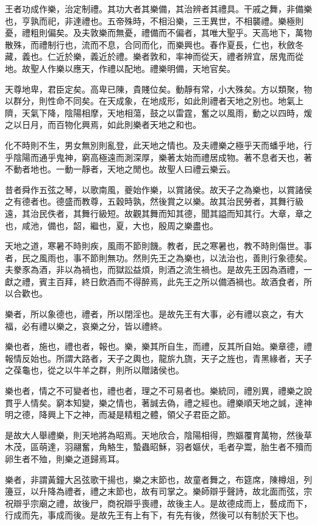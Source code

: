 王者功成作樂，治定制禮。其功大者其樂備，其治辨者其禮具。干戚之舞，非備樂也，亨孰而祀，非達禮也。五帝殊時，不相沿樂，三王異世，不相襲禮。樂極則憂，禮粗則偏矣。及夫敦樂而無憂，禮備而不偏者，其唯大聖乎。天高地下，萬物散殊，而禮制行也，流而不息，合同而化，而樂興也。春作夏長，仁也，秋斂冬藏，義也。仁近於樂，義近於禮。樂者敦和，率神而從天，禮者辨宜，居鬼而從地。故聖人作樂以應天，作禮以配地。禮樂明備，天地官矣。

天尊地卑，君臣定矣。高卑已陳，貴賤位矣。動靜有常，小大殊矣。方以類聚，物以群分，則性命不同矣。在天成象，在地成形，如此則禮者天地之別也。地氣上隮，天氣下降，陰陽相摩，天地相蕩，鼓之以雷霆，奮之以風雨，動之以四時，煖之以日月，而百物化興焉，如此則樂者天地之和也。

化不時則不生，男女無別則亂登，此天地之情也。及夫禮樂之極乎天而蟠乎地，行乎陰陽而通乎鬼神，窮高極遠而測深厚，樂著太始而禮居成物。著不息者天也，著不動者地也。一動一靜者，天地之閒也。故聖人曰禮云樂云。

昔者舜作五弦之琴，以歌南風，夔始作樂，以賞諸侯。故天子之為樂也，以賞諸侯之有德者也。德盛而教尊，五穀時孰，然後賞之以樂。故其治民勞者，其舞行級遠，其治民佚者，其舞行級短。故觀其舞而知其德，聞其謚而知其行。大章，章之也，咸池，備也，韶，繼也，夏，大也，殷周之樂盡也。

天地之道，寒暑不時則疾，風雨不節則饑。教者，民之寒暑也，教不時則傷世。事者，民之風雨也，事不節則無功。然則先王之為樂也，以法治也，善則行象德矣。夫豢豕為酒，非以為禍也，而獄訟益煩，則酒之流生禍也。是故先王因為酒禮，一獻之禮，賓主百拜，終日飲酒而不得醉焉，此先王之所以備酒禍也。故酒食者，所以合歡也。

樂者，所以象德也，禮者，所以閉淫也。是故先王有大事，必有禮以哀之，有大福，必有禮以樂之，哀樂之分，皆以禮終。

樂也者，施也，禮也者，報也。樂，樂其所自生，而禮，反其所自始。樂章德，禮報情反始也。所謂大路者，天子之輿也，龍旂九旒，天子之旌也，青黑緣者，天子之葆龜也，從之以牛羊之群，則所以贈諸侯也。

樂也者，情之不可變者也，禮也者，理之不可易者也。樂統同，禮別異，禮樂之說貫乎人情矣。窮本知變，樂之情也，著誠去偽，禮之經也。禮樂順天地之誠，達神明之德，降興上下之神，而凝是精粗之體，領父子君臣之節。

是故大人舉禮樂，則天地將為昭焉。天地欣合，陰陽相得，煦嫗覆育萬物，然後草木茂，區萌達，羽翮奮，角觡生，蟄蟲昭穌，羽者嫗伏，毛者孕鬻，胎生者不殰而卵生者不殈，則樂之道歸焉耳。

樂者，非謂黃鐘大呂弦歌干揚也，樂之末節也，故童者舞之，布筵席，陳樽俎，列籩豆，以升降為禮者，禮之末節也，故有司掌之。樂師辯乎聲詩，故北面而弦，宗祝辯乎宗廟之禮，故後尸，商祝辯乎喪禮，故後主人。是故德成而上，藝成而下，行成而先，事成而後。是故先王有上有下，有先有後，然後可以有制於天下也。

